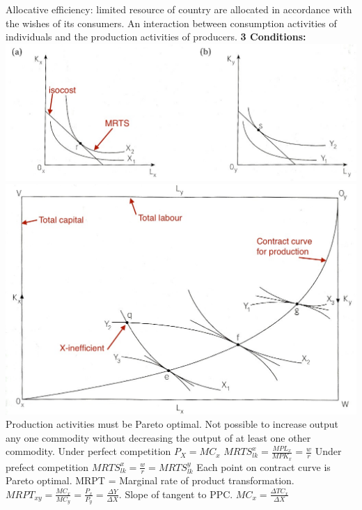 \documentclass[12pt]{examnotes}
\begin{document}
\ra Allocative efficiency: limited resource of country are allocated in accordance with the wishes of its consumers. 
\ra An interaction between consumption activities of individuals and the production activities of producers.
{\bf 3 Conditions:}
\includegraphics[scale=0.4]{./imgs/21.jpg}
\includegraphics[scale=0.3]{./imgs/22.jpg}
\ra Production activities must be Pareto optimal. Not possible to increase output any one commodity without decreasing the output of at least one other commodity. 
\ra Under perfect competition $P_X=MC_x$  
\vspace{3pt}
\ra $MRTS^x_{lk}=\displaystyle\frac{MPL_x}{MPK_x}=\frac{w}{r}$
\vspace{3pt}
\ra Under prefect competition $MRTS_{lk}^x=\frac{w}{r}=MRTS_{lk}^y$
\ra Each point on contract curve is Pareto optimal.
\ra MRPT = Marginal rate of product transformation.
\vspace{3pt}
\ra $MRPT_{xy}=\displaystyle\frac{MC_x}{MC_y}=\frac{P_x}{P_y}=\frac{\Delta Y}{\Delta X}$. Slope of tangent to PPC.
\ra 
\vspace{3pt}
\ra $MC_x=\displaystyle\frac{\Delta TC_x}{\Delta X}$
\vspace{3pt}
\end{document}

